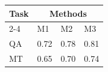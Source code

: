 \begin{table}[htbp]
\centering
\begin{tabular}{llll}
\toprule
\multirow{2}{*}{Task} & \multicolumn{3}{c}{Methods} \\
\cmidrule(lr){2-4}
 & M1 & M2 & M3 \\
\midrule
QA & 0.72 & 0.78 & 0.81 \\
MT & 0.65 & 0.70 & 0.74 \\
\bottomrule
\end{tabular}
\end{table}

